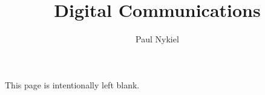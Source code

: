 \documentclass[10pt]{report}
\title{Digital Communications}
\author{Paul Nykiel}
\begin{document}
    \maketitle
    \pagebreak
    This page is intentionally left blank.
    \pagebreak
    \tableofcontents
    \pagebreak
    
    
    
    
    
    
    
    

    \appendix
    
    
\end{document}
